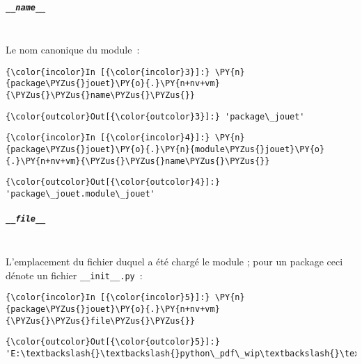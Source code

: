     \hypertarget{name__}{%
\subparagraph{\texorpdfstring{\texttt{\_\_name\_\_}}{\_\_name\_\_}\\\\}\label{name__}}

    Le nom canonique du module~:

    \begin{Verbatim}[commandchars=\\\{\}]
{\color{incolor}In [{\color{incolor}3}]:} \PY{n}{package\PYZus{}jouet}\PY{o}{.}\PY{n+nv+vm}{\PYZus{}\PYZus{}name\PYZus{}\PYZus{}}
\end{Verbatim}


\begin{Verbatim}[commandchars=\\\{\}]
{\color{outcolor}Out[{\color{outcolor}3}]:} 'package\_jouet'
\end{Verbatim}
            
    \begin{Verbatim}[commandchars=\\\{\}]
{\color{incolor}In [{\color{incolor}4}]:} \PY{n}{package\PYZus{}jouet}\PY{o}{.}\PY{n}{module\PYZus{}jouet}\PY{o}{.}\PY{n+nv+vm}{\PYZus{}\PYZus{}name\PYZus{}\PYZus{}}
\end{Verbatim}


\begin{Verbatim}[commandchars=\\\{\}]
{\color{outcolor}Out[{\color{outcolor}4}]:} 'package\_jouet.module\_jouet'
\end{Verbatim}
            
    \hypertarget{file__}{%
\subparagraph{\texorpdfstring{\texttt{\_\_file\_\_}}{\_\_file\_\_}\\\\}\label{file__}}

    L'emplacement du fichier duquel a été chargé le module ; pour un package
ceci dénote un fichier \texttt{\_\_init\_\_.py}~:

    \begin{Verbatim}[commandchars=\\\{\}]
{\color{incolor}In [{\color{incolor}5}]:} \PY{n}{package\PYZus{}jouet}\PY{o}{.}\PY{n+nv+vm}{\PYZus{}\PYZus{}file\PYZus{}\PYZus{}}
\end{Verbatim}


\begin{Verbatim}[commandchars=\\\{\}]
{\color{outcolor}Out[{\color{outcolor}5}]:} 'E:\textbackslash{}\textbackslash{}python\_pdf\_wip\textbackslash{}\textbackslash{}flotpython\textbackslash{}\textbackslash{}w5\textbackslash{}\textbackslash{}package\_jouet\textbackslash{}\textbackslash{}\_\_init\_\_.py'
\end{Verbatim}
            

